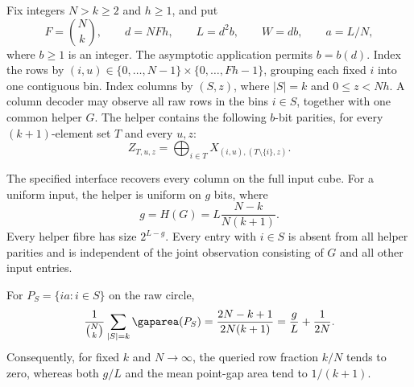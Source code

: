 Fix integers $N>k\ge2$ and $h\ge1$, and put
\[
 F=\binom Nk,\qquad d=NFh,\qquad L=d^2b,
 \qquad W=db,\qquad a=L/N,
\]
where $b\ge1$ is an integer.  The asymptotic application permits
$b=b(d)$.  Index the rows by $(i,u)\in\{0,\ldots,N-1\}\times
\{0,\ldots,Fh-1\}$, grouping each fixed $i$ into one contiguous bin.
Index columns by $(S,z)$, where $|S|=k$ and $0\le z<Nh$.  A column
decoder may observe all raw rows in the bins $i\in S$, together with
one common helper $G$.  The helper contains the following $b$-bit
parities, for every $(k+1)$-element set $T$ and every $u,z$:
\begin{equation}
 Z_{T,u,z}=\bigoplus_{i\in T}
              X_{(i,u),(T\setminus\{i\},z)}.
 \label{eq:subset-helper}
\end{equation}

\begin{proposition}
\label{prop:subset-calibration}
The specified interface recovers every column on the full input cube.
For a uniform input, the helper is uniform on $g$ bits, where
\begin{equation}
 g=H(G)=L\frac{N-k}{N(k+1)}.
 \label{eq:subset-helper-size}
\end{equation}
Every helper fibre has size $2^{L-g}$.  Every entry with $i\in S$ is
absent from all helper parities and is independent of the joint
observation consisting of $G$ and all other input entries.

For $P_S=\{ia:i\in S\}$ on the raw circle,
\begin{equation}
 \frac1{\binom Nk}\sum_{|S|=k}\gaparea(P_S)
   =\frac{2N-k+1}{2N(k+1)}
   =\frac gL+\frac1{2N}.
 \label{eq:subset-gap-area}
\end{equation}
Consequently, for fixed $k$ and $N\to\infty$, the queried row fraction
$k/N$ tends to zero, whereas both $g/L$ and the mean point-gap area
tend to $1/(k+1)$.
\end{proposition}

